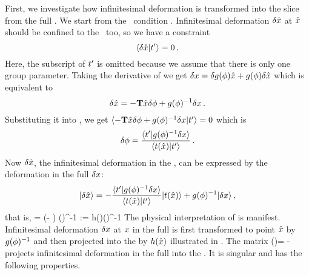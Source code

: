First, we investigate how infinitesimal deformation is
transformed into the slice from the full \statesp.
We start from the \slice\ condition .
Infinitesimal deformation $\delta \hat{x}$ at $\hat{x}$
should be confined to the \slice\ too, so we have a constraint
\begin{equation}
  \braket{\delta \sspRed}{\sliceTan{}}=0
  \,.
  \label{eq:constraint_dx}
\end{equation}
Here, the subscript of $t'_{}$ is omitted because we assume
that there
is only one group parameter.
Taking the derivative of  we get
$ \delta x = \delta g({\bf \phi}) \hat{x} + g({\bf \phi})
\delta \hat{x} $ which is equivalent to
\[
  \delta \hat{x}=-\mathbf{T} \hat{x}\delta {\bf \phi} + g({\bf \phi})^{-1}\delta x
  \,.
\]
Substituting it into ,
we get
$\braket{-\mathbf{T}\sspRed\delta \gSpace + \LieEl(\gSpace)^{-1}
\delta\ssp}{t'}=0$
which is
\begin{equation}
  \label{eq:delta_theta}
  \delta \gSpace=
  \frac{\braket{\sliceTan{}}{\LieEl(\gSpace)^{-1}\delta\ssp}}
  {\braket{\groupTan(\sspRed)}{\sliceTan{}}}
\,.
\end{equation}
Now  $\delta \hat{x}$, the infinitesimal deformation in the \slice, can be
expressed by the deformation in the full {\statesp} $\delta x$:
\begin{equation*}
  \ket{\delta \sspRed}
  =
  -\frac{\braket{\sliceTan{}}{\LieEl(\gSpace)^{-1}\delta\ssp}}
  {\braket{\groupTan(\sspRed)}{\sliceTan{}}}
  \ket{\groupTan(\sspRed)}
  + \LieEl(\gSpace)^{-1} \ket{\delta \ssp}
  \,,
\end{equation*}
that is,
\beq
\label{eq:variation_full_slice}
\ket{\delta \sspRed} =
\left(\matId-\frac{\ket{\groupTan(\sspRed)}\bra{\sliceTan{}}}
  {\braket{\groupTan(\sspRed)}{\sliceTan{}}} \right)
\LieEl(\gSpace)^{-1}\ket{\delta \ssp}
:=
h(\sspRed)\LieEl(\gSpace)^{-1}\ket{\delta \ssp}
\eeq
The physical interpretation of  is manifest.
Infinitesimal deformation $\delta x$ at $x$ in the full {\statesp} is
first transformed to point $\hat{x}$ by $g({\bf \phi})^{-1}$ and then
projected into the {\slice} by $h(\hat{x})$ illustrated in
.
The matrix
\beq
\pMat(\sspRed)=
    \matId-\frac{\ket{\groupTan(\sspRed)}\bra{\sliceTan{}}}
    {\braket{\groupTan(\sspRed)}{\sliceTan{}}}
projects infinitesimal deformation in the full {\statesp} into the {\slice}.
It is singular and has the following properties.
